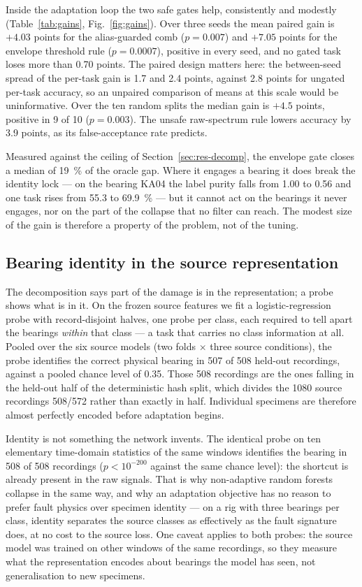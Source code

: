 Inside the adaptation loop the two safe gates help, consistently and modestly (Table~\ref{tab:gains},
Fig.~\ref{fig:gains}). Over three seeds the mean paired gain is $+4.03$ points for the alias-guarded comb ($p=0.007$) and
$+7.05$ points for the envelope threshold rule ($p=0.0007$), positive in every seed, and no gated task loses more than 0.70
points. The paired design matters here: the between-seed spread of the per-task gain is 1.7 and 2.4 points, against 2.8
points for ungated per-task accuracy, so an unpaired comparison of means at this scale would be uninformative. Over the ten
random splits the median gain is $+4.5$ points, positive in 9 of 10 ($p=0.003$). The unsafe raw-spectrum rule lowers
accuracy by 3.9 points, as its false-acceptance rate predicts.

Measured against the ceiling of Section~\ref{sec:res-decomp}, the envelope gate closes a median of \SI{19}{\percent} of the
oracle gap. Where it engages a bearing it does break the identity lock --- on the bearing KA04 the label purity falls from
1.00 to 0.56 and one task rises from \SI{55.3}{} to \SI{69.9}{\percent} --- but it cannot act on the bearings it never
engages, nor on the part of the collapse that no filter can reach. The modest size of the gain is therefore a property of
the problem, not of the tuning.

\subsection{Bearing identity in the source representation}
\label{sec:res-probe}

The decomposition says part of the damage is in the representation; a probe shows what is in it. On the frozen source
features we fit a logistic-regression probe with record-disjoint halves, one probe per class, each required to tell apart
the bearings \emph{within} that class --- a task that carries no class information at all. Pooled over the six source models
(two folds $\times$ three source conditions), the probe identifies the correct physical bearing in 507 of 508 held-out
recordings, against a pooled chance level of 0.35. Those 508 recordings are the ones falling in the held-out half of the
deterministic hash split, which divides the 1080 source recordings 508/572 rather than exactly in half. Individual specimens
are therefore almost perfectly encoded before adaptation begins.

Identity is not something the network invents. The identical probe on ten elementary time-domain statistics of the same
windows identifies the bearing in 508 of 508 recordings ($p < 10^{-200}$ against the same chance level): the shortcut is
already present in the raw signals. That is why non-adaptive random forests collapse in the same way, and why an adaptation
objective has no reason to prefer fault physics over specimen identity --- on a rig with three bearings per class, identity
separates the source classes as effectively as the fault signature does, at no cost to the source loss. One caveat applies
to both probes: the source model was trained on other windows of the same recordings, so they measure what the
representation encodes about bearings the model has seen, not generalisation to new specimens.

